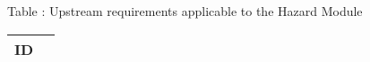 {
  \vspace{0.5em}
  \begin{center}
    Table \thetable: Upstream requirements applicable to the Hazard Module\label{tab:hzdm-upstream-requirements}
  \end{center}
  
\footnotesize
\begin{xltabular}{0.9\textwidth}{|X|c|}
  \hline
  \textbf{ID} \\
  \hline
\end{xltabular}
}
